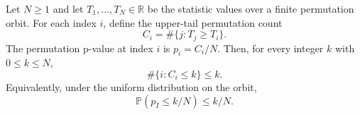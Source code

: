 \begin{theorem}
Let $N\ge 1$ and let $T_1,\ldots,T_N\in\mathbb R$ be the statistic values
over a finite permutation orbit. For each index $i$, define the upper-tail
permutation count
\[
C_i=\#\{j: T_j\ge T_i\}.
\]
The permutation p-value at index $i$ is $p_i=C_i/N$. Then, for every integer
$k$ with $0\le k\le N$,
\[
\#\{i:C_i\le k\}\le k.
\]
Equivalently, under the uniform distribution on the orbit,
\[
\mathbb P(p_I\le k/N)\le k/N .
\]
\end{theorem}
